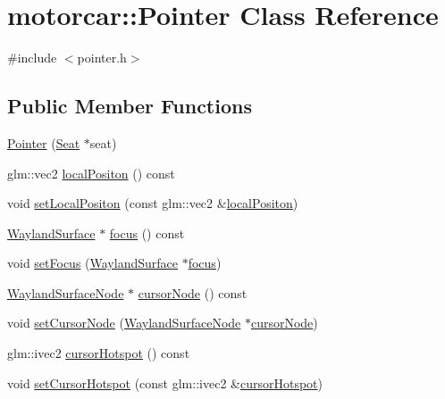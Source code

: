 \hypertarget{classmotorcar_1_1Pointer}{\section{motorcar\-:\-:Pointer Class Reference}
\label{classmotorcar_1_1Pointer}
}


{\ttfamily \#include $<$pointer.\-h$>$}

\subsection*{Public Member Functions}
\begin{DoxyCompactItemize}
\item 
\hyperlink{classmotorcar_1_1Pointer_abfbd5397af7d39289d7f3d7eb2db734d}{Pointer} (\hyperlink{classmotorcar_1_1Seat}{Seat} $\ast$seat)
\item 
glm\-::vec2 \hyperlink{classmotorcar_1_1Pointer_a19f25225f16b8f4f2289e008bc75d957}{local\-Positon} () const 
\item 
void \hyperlink{classmotorcar_1_1Pointer_abe379b3238e6fe31b959b8affdc00ea2}{set\-Local\-Positon} (const glm\-::vec2 \&\hyperlink{classmotorcar_1_1Pointer_a19f25225f16b8f4f2289e008bc75d957}{local\-Positon})
\item 
\hyperlink{classmotorcar_1_1WaylandSurface}{Wayland\-Surface} $\ast$ \hyperlink{classmotorcar_1_1Pointer_a6b93402a87e64c673fef44d0102be63b}{focus} () const 
\item 
void \hyperlink{classmotorcar_1_1Pointer_afea4df13d7805e699c523c7aaaf30c4c}{set\-Focus} (\hyperlink{classmotorcar_1_1WaylandSurface}{Wayland\-Surface} $\ast$\hyperlink{classmotorcar_1_1Pointer_a6b93402a87e64c673fef44d0102be63b}{focus})
\item 
\hyperlink{classmotorcar_1_1WaylandSurfaceNode}{Wayland\-Surface\-Node} $\ast$ \hyperlink{classmotorcar_1_1Pointer_a97586b3be93be794761ca2b97864fc9e}{cursor\-Node} () const 
\item 
void \hyperlink{classmotorcar_1_1Pointer_a0bb8c2cfc6523155cc4b3f37487937fa}{set\-Cursor\-Node} (\hyperlink{classmotorcar_1_1WaylandSurfaceNode}{Wayland\-Surface\-Node} $\ast$\hyperlink{classmotorcar_1_1Pointer_a97586b3be93be794761ca2b97864fc9e}{cursor\-Node})
\item 
glm\-::ivec2 \hyperlink{classmotorcar_1_1Pointer_ae847516f0a34b7018bf0cdbd26a7d831}{cursor\-Hotspot} () const 
\item 
void \hyperlink{classmotorcar_1_1Pointer_ae8f489d37a9520e41d8f5162cff3992e}{set\-Cursor\-Hotspot} (const glm\-::ivec2 \&\hyperlink{classmotorcar_1_1Pointer_ae847516f0a34b7018bf0cdbd26a7d831}{cursor\-Hotspot})
\end{DoxyCompactItemize}


